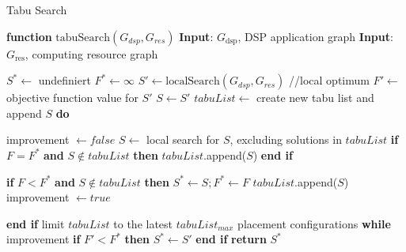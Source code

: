 \documentclass{article}
\begin{document}
\begin{minipage}{0.5\textwidth}
\begin{algorithm}[H]
    \caption{Tabu Search}
    \begin{algorithmic}[1]
        \STATE \textbf{function} $\mathrm{tabuSearch}(G_{dsp}, G_{res})$
        \STATE \textbf{Input}: $G_{\text{dsp}}$, DSP application graph
        \STATE \textbf{Input}: $G_{\text{res}}$, computing resource graph

        \STATE $S^* \leftarrow$ undefiniert
        \STATE $F^* \leftarrow \infty$
        \STATE $S' \leftarrow \text{localSearch}(G_{dsp}, G_{res})$   //local optimum
        \STATE $F' \leftarrow$ objective function value for $S'$
        \STATE $S  \leftarrow S'$
        \STATE $tabuList \leftarrow$ create new tabu list and append $S$
        \STATE \textbf{do}

        \STATE \hspace{\algorithmicindent} improvement $\leftarrow false$
        \STATE \hspace{\algorithmicindent} $S \leftarrow$  local search for $S$, excluding solutions in $tabuList$
        \STATE \hspace{\algorithmicindent} \textbf{if} $F = F^*$ \textbf{and} $S \notin tabuList$ \textbf{then} $tabuList$.append($S$) 
        \STATE \hspace{\algorithmicindent} \textbf{end if}

        \STATE \hspace{\algorithmicindent} \textbf{if} $F < F^*$ \textbf{and} $S \notin tabuList$ \textbf{then} 
        \STATE \hspace{\algorithmicindent} \hspace{\algorithmicindent} $S^* \leftarrow S; F^* \leftarrow F$
        \STATE \hspace{\algorithmicindent} \hspace{\algorithmicindent} $tabuList$.append($S$)
        \STATE \hspace{\algorithmicindent} \hspace{\algorithmicindent} improvement $\leftarrow true$

        \STATE \hspace{\algorithmicindent} \textbf{end if}
        \STATE \hspace{\algorithmicindent} limit $tabuList$ to the latest $tabuList_{max}$ placement configurations
        \STATE \textbf{while} improvement
        \STATE \textbf{if} $F' < F^*$ \textbf{then} $S^* \leftarrow S'$ \textbf{end if}
        \STATE \textbf{return} $S^*$

    \end{algorithmic}
\end{algorithm}

\end{minipage}  
\end{document}
